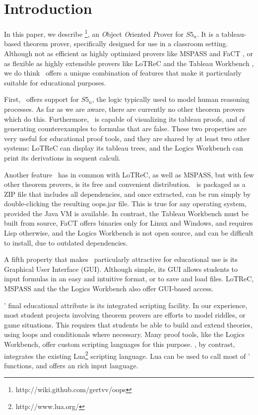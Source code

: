 \section{Introduction}
\label{sec:introduction}

In this paper, we describe \oops\footnote{http://wiki.github.com/gertvv/oops},
an {\it O}bject {\it O}riented {\it P}rover for $S5_n$.
It is a tableau-based theorem prover, specifically designed for use in a
classroom setting.
Although not as efficient as highly optimized provers like MSPASS
\citep{mspass2000} and FaCT \citep{fact1998}, or as flexible as highly
extensible provers like LoTReC \citep{lotrec2005} and the Tableau Workbench
\citep{twb2009}, we do think \oops\ offers a unique combination of features
that make it particularly suitable for educational purposes.

First, \oops\ offers support for $S5_n$, the logic typically used to model
human reasoning processes.
As far as we are aware, there are currently no other theorem provers which do
this.
Furthermore, \oops\ is capable of visualizing its tableau proofs, and of
generating counterexamples to formulas that are false.
These two properties are very useful for educational proof tools, and they are
shared by at least two other systems: LoTReC can display its tableau trees,
and the Logics Workbench \citep{heuerding1996} can print its derivations in
sequent calculi.

Another feature \oops\ has in common with LoTReC, as well as MSPASS, but with
few other theorem provers, is its free and convenient distribution.
\oops\ is packaged as a ZIP file that includes all dependencies, and once
extracted, can be run simply by double-clicking the resulting oops.jar file.
This is true for any operating system, provided the Java VM is available.
In contrast, the Tableau Workbench must be built from source,
FaCT offers binaries only for Linux and Windows, and requires
Lisp otherwise, and the Logics Workbench is not open source, and can be difficult to install, due to outdated dependencies.

A fifth property that makes \oops\ particularly attractive for educational use
is its Graphical User Interface (GUI).
Although simple, its GUI allows students to input formulas in an easy and
intuitive format, or to save and load files.  LoTReC, MSPASS and the the Logics Workbench also offer GUI-based access.

\oops' final educational attribute is its integrated scripting facility.
In our experience, most student projects involving theorem provers are efforts
to model riddles, or game situations.
This requires that students be able to build and extend theories, using loops
and conditionals where necessary.
Many proof tools, like the Logics Workbench, offer custom scripting languages
for this purpose.
\oops, by contrast, integrates the existing Lua\footnote{http://www.lua.org/}
scripting language.
Lua can be used to call most of \oops' functions, and offers an  rich input
language.

